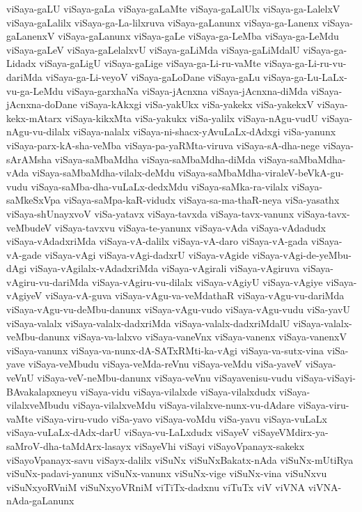 {viSaya-gaLU
viSaya-gaLa
viSaya-gaLaMte
viSaya-gaLalUlx
viSaya-ga-LalelxV
viSaya-gaLalilx
viSaya-ga-La-lilxruva
viSaya-gaLanunx
viSaya-ga-Lanenx
viSaya-gaLanenxV
viSaya-gaLanunx
viSaya-gaLe
viSaya-ga-LeMba
viSaya-ga-LeMdu
viSaya-gaLeV
viSaya-gaLelalxvU
viSaya-gaLiMda
viSaya-gaLiMdalU
viSaya-ga-Lidadx
viSaya-gaLigU
viSaya-gaLige
viSaya-ga-Li-ru-vaMte
viSaya-ga-Li-ru-vu-dariMda
viSaya-ga-Li-veyoV
viSaya-gaLoDane
viSaya-gaLu
viSaya-ga-Lu-LaLx-vu-ga-LeMdu
viSaya-garxhaNa
viSaya-jAcnxna
viSaya-jAcnxna-diMda
viSaya-jAcnxna-doDane
viSaya-kAkxgi
viSa-yakUkx
viSa-yakekx
viSa-yakekxV
viSaya-kekx-mAtarx
viSaya-kikxMta
viSa-yakukx
viSa-yalilx
viSaya-nAgu-vudU
viSaya-nAgu-vu-dilalx
viSaya-nalalx
viSaya-ni-shacx-yAvuLaLx-dAdxgi
viSa-yanunx
viSaya-parx-kA-sha-veMba
viSaya-pa-yaRMta-viruva
viSaya-sA-dha-nege
viSaya-sArAMsha
viSaya-saMbaMdha
viSaya-saMbaMdha-diMda
viSaya-saMbaMdha-vAda
viSaya-saMbaMdha-vilalx-deMdu
viSaya-saMbaMdha-viraleV-beVkA-gu-vudu
viSaya-saMba-dha-vuLaLx-dedxMdu
viSaya-saMka-ra-vilalx
viSaya-saMkeSxVpa
viSaya-saMpa-kaR-vidudx
viSaya-sa-ma-thaR-neya
viSa-yasathx
viSaya-shUnayxvoV
viSa-yatavx
viSaya-tavxda
viSaya-tavx-vanunx
viSaya-tavx-veMbudeV
viSaya-tavxvu
viSaya-te-yanunx
viSaya-vAda
viSaya-vAdadudx
viSaya-vAdadxriMda
viSaya-vA-dalilx
viSaya-vA-daro
viSaya-vA-gada
viSaya-vA-gade
viSaya-vAgi
viSaya-vAgi-dadxrU
viSaya-vAgide
viSaya-vAgi-de-yeMbu-dAgi
viSaya-vAgilalx-vAdadxriMda
viSaya-vAgirali
viSaya-vAgiruva
viSaya-vAgiru-vu-dariMda
viSaya-vAgiru-vu-dilalx
viSaya-vAgiyU
viSaya-vAgiye
viSaya-vAgiyeV
viSaya-vA-guva
viSaya-vAgu-va-veMdathaR
viSaya-vAgu-vu-dariMda
viSaya-vAgu-vu-deMbu-danunx
viSaya-vAgu-vudo
viSaya-vAgu-vudu
viSa-yavU
viSaya-valalx
viSaya-valalx-dadxriMda
viSaya-valalx-dadxriMdalU
viSaya-valalx-veMbu-danunx
viSaya-va-lalxvo
viSaya-vaneVnx
viSaya-vanenx
viSaya-vanenxV
viSaya-vanunx
viSaya-va-nunx-dA-SATxRMti-ka-vAgi
viSaya-va-sutx-vina
viSa-yave
viSaya-veMbudu
viSaya-veMda-reVnu
viSaya-veMdu
viSa-yaveV
viSaya-veVnU
viSaya-veV-neMbu-danunx
viSaya-veVnu
viSayavenisu-vudu
viSaya-viSayi-BAvakalapxneyu
viSaya-vidu
viSaya-vilalxde
viSaya-vilalxdudx
viSaya-vilalxveMbudu
viSaya-vilalxveMdu
viSaya-vilalxve-nunx-vu-dAdare
viSaya-viru-vaMte
viSaya-viru-vudo
viSa-yavo
viSaya-voMdu
viSa-yavu
viSaya-vuLaLx
viSaya-vuLaLx-dAdx-darU
viSaya-vu-LaLxdudx
viSayeV
viSayeVMdirx-ya-saMroV-dha-taMdArx-lasayx
viSayeVhi
viSayi
viSayoVpanayx-sakekx
viSayoVpanayx-savu
viSayx-dalilx
viSuNx
viSuNxBakatx-nAda
viSuNx-mUtiRya
viSuNx-padavi-yanunx
viSuNx-vanunx
viSuNx-vige
viSuNx-vina
viSuNxvu
viSuNxyoRVniM
viSuNxyoVRniM
viTiTx-dadxnu
viTuTx
viV
viVNA
viVNA-nAda-gaLanunx
}

